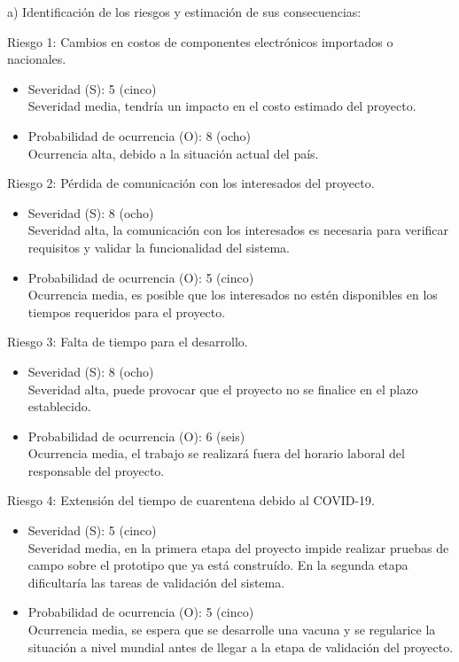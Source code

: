 \documentclass[11pt]{charter}
\begin{document}
a) Identificación de los riesgos y estimación de sus consecuencias:

Riesgo 1: Cambios en costos de componentes electrónicos importados o nacionales.
\begin{itemize}
\item Severidad (S): 5 (cinco) \\
Severidad media, tendría un impacto en el costo estimado del proyecto.
\item Probabilidad de ocurrencia (O): 8 (ocho) \\
Ocurrencia alta, debido a la situación actual del país. 
\end{itemize}

Riesgo 2: Pérdida de comunicación con los interesados del proyecto.
\begin{itemize}
\item Severidad (S): 8 (ocho) \\
Severidad alta, la comunicación con los interesados es necesaria para verificar requisitos y validar la funcionalidad del sistema.
\item Probabilidad de ocurrencia (O): 5 (cinco) \\
Ocurrencia media, es posible que los interesados no estén disponibles en los tiempos requeridos para el proyecto.
\end{itemize}

\newpage

Riesgo 3: Falta de tiempo para el desarrollo.
\begin{itemize}
\item Severidad (S): 8 (ocho) \\
Severidad alta, puede provocar que el proyecto no se finalice en el plazo establecido.
\item Probabilidad de ocurrencia (O): 6 (seis) \\
Ocurrencia media, el trabajo se realizará fuera del horario laboral del responsable del proyecto.
\end{itemize} 

Riesgo 4: Extensión del tiempo de cuarentena debido al COVID-19.
\begin{itemize}
\item Severidad (S): 5 (cinco) \\
Severidad media, en la primera etapa del proyecto impide realizar pruebas de campo sobre el prototipo que ya está construído. En la segunda etapa
dificultaría las tareas de validación del sistema.
\item Probabilidad de ocurrencia (O): 5 (cinco) \\
Ocurrencia media, se espera que se desarrolle una vacuna y se regularice la situación a nivel mundial antes de llegar a la etapa de validación del proyecto.
\end{itemize}
\end{document}
